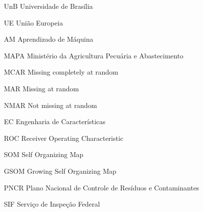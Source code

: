 \begin{siglas}
  \item[UnB] Universidade de Brasília
 	\item[UE] União Europeia
	\item[AM] Aprendizado de Máquina
	\item[MAPA] Ministério da Agricultura Pecuária e Abastecimento
	\item[MCAR] Missing completely at random
	\item[MAR] Missing at random
	\item[NMAR] Not missing at random
	\item[EC] Engenharia de Características
	\item[ROC] Receiver Operating Characteristic
	\item[SOM] Self Organizing Map
	\item[GSOM] Growing Self Organizing Map
	\item[PNCR] Plano Nacional de Controle de Resíduos e Contaminantes
	\item[SIF] Serviço de Inspeção Federal
	\end{siglas}
